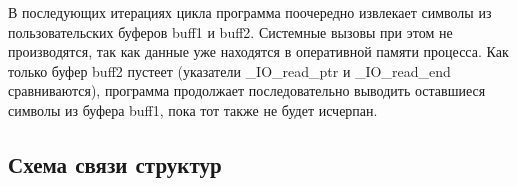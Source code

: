 В последующих итерациях цикла программа поочередно извлекает символы из 
пользовательских буферов buff1 и buff2. Системные вызовы при этом не 
производятся, так как данные уже находятся в оперативной памяти процесса. 
Как только буфер buff2 пустеет (указатели \_IO\_read\_ptr и \_IO\_read\_end 
сравниваются), программа продолжает последовательно выводить оставшиеся 
символы из буфера buff1, пока тот также не будет исчерпан.

\subsection{Схема связи структур}
